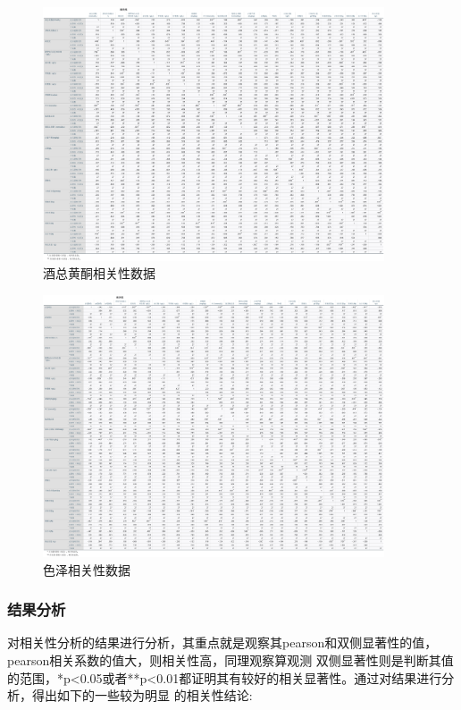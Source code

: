 \documentclass[UTF8]{ctexart}
\begin{document}
\begin{figure}[H]\centering
	\includegraphics[width=0.9\textwidth]{img/Correlation_data_of_total flavonoids_in_wine.png} %
	\caption{酒总黄酮相关性数据} %
	\label{fig:figure 3} %
\end{figure}

\begin{figure}[H]\centering
	\includegraphics[width=0.9\textwidth]{img/Color_correlation_data.png} %
	\caption{色泽相关性数据} %
	\label{fig:figure 4} %
\end{figure}

\newpage

\subsubsection{结果分析}
对相关性分析的结果进行分析，其重点就是观察其pearson和双侧显著性的值，pearson相关系数的值大，则相关性高，同理观察算观测
双侧显著性则是判断其值的范围，*p<0.05或者**p<0.01都证明其有较好的相关显著性。通过对结果进行分析，得出如下的一些较为明显
的相关性结论:
\end{document}
